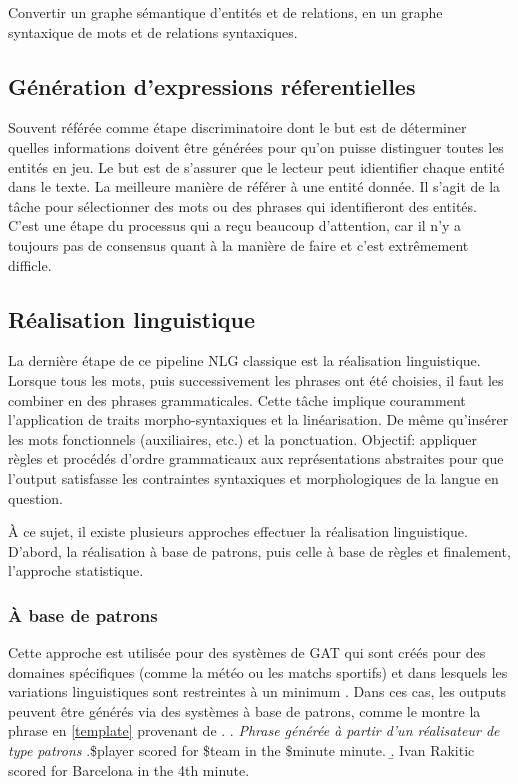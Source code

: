 Convertir un graphe sémantique d'entités et de relations, en un graphe syntaxique de mots et de relations syntaxiques. 

\subsection{Génération d'expressions réferentielles}
Souvent référée comme étape discriminatoire dont le but est de déterminer quelles informations doivent être générées pour qu'on puisse distinguer toutes les entités en jeu. Le but est de s'assurer que le lecteur peut idientifier chaque entité dans le texte. La meilleure manière de référer à une entité donnée.
Il s'agit de la tâche pour sélectionner des mots ou des phrases qui identifieront des entités. C'est une étape du processus qui a reçu beaucoup d'attention, car il n'y a toujours pas de consensus quant à la manière de faire et c'est extrêmement difficle.

\subsection{Réalisation linguistique}
La dernière étape de ce pipeline NLG classique est la réalisation linguistique. Lorsque tous les mots, puis successivement les phrases ont été choisies, il faut les combiner en des phrases grammaticales. Cette tâche implique couramment l'application de traits morpho-syntaxiques et la linéarisation. De même qu'insérer les mots fonctionnels (auxiliaires, etc.) et la ponctuation. \citep{LambreyImplementationcollocationspour2017} Objectif: appliquer règles et procédés d'ordre grammaticaux aux représentations abstraites pour que l'output satisfasse les contraintes syntaxiques et morphologiques de la langue en question.

À ce sujet, il existe plusieurs approches effectuer la réalisation linguistique. D'abord, la réalisation à base de patrons, puis celle à base de règles et finalement, l'approche statistique.

\subsubsection{À base de patrons}
Cette approche est utilisée pour des systèmes de \ac{GAT} qui sont créés pour des domaines spécifiques (comme la météo ou les matchs sportifs) et dans lesquels les variations linguistiques sont restreintes à un minimum \citep{mcroy_channarukul_ali_2003}. Dans ces cas, les outputs peuvent être générés via des systèmes à base de patrons, comme le montre la phrase en \ref{template} provenant de \citep{gatt18}.
\ex. \label{template} \emph{Phrase générée à partir d'un réalisateur de type patrons}
	\a.\$player scored for \$team in the \$minute minute. 
	\b. Ivan Rakitic scored for Barcelona in the 4th minute.

